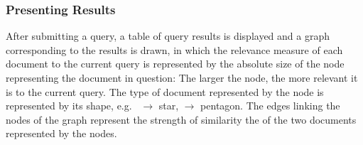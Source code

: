 \subsubsection {Presenting Results}
\label{sec:presenting_results}
After submitting a query, a table of query results is displayed and a graph corresponding to the results is drawn, in which the relevance measure of each document to the current query is represented by the absolute size of the node representing the document in question: The larger the node, the more relevant it is to the current query. The type of document represented by the node is represented by its shape, e.g.\  $\rightarrow$ star,  $\rightarrow$ pentagon. The edges linking the nodes of the graph represent the strength of similarity the of the two documents represented by the nodes.
